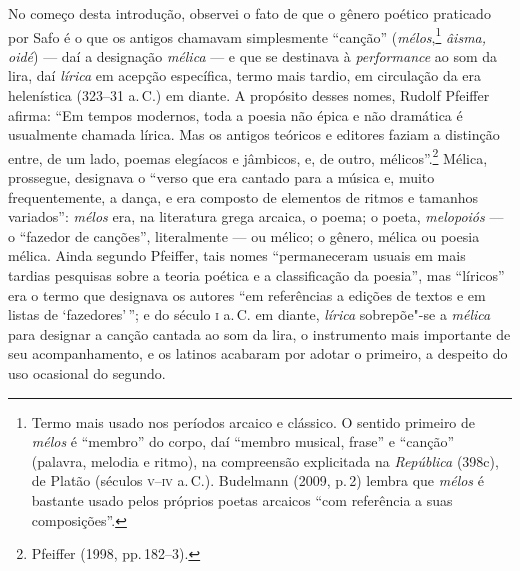 No começo desta introdução, observei o fato de que o gênero poético praticado
por Safo é o que os antigos chamavam simplesmente “canção”
(\emph{mélos},\footnote{ Termo mais usado nos períodos arcaico e clássico.
O sentido primeiro de \emph{mélos} é “membro” do corpo, daí “membro
musical, frase” e “canção” (palavra, melodia e ritmo), na compreensão
explicitada na \emph{República} (398c), de Platão (séculos \textsc{v}--\textsc{iv} a.\,C.).
Budelmann (2009, p.\,2) lembra que \emph{mélos} é bastante usado pelos próprios poetas arcaicos ``com referência a suas composições”.} \emph{âisma, oidé}) --- daí a
designação \emph{mélica} --- e que se destinava à \emph{performance} ao som
da lira, daí \emph{lírica} em acepção específica, termo mais tardio, em
circulação da era helenística (323--31 a.\,C.) em diante. A propósito
desses nomes, Rudolf Pfeiffer afirma: “Em tempos
modernos, toda a poesia não épica e não dramática é usualmente chamada lírica.
Mas os antigos teóricos e editores faziam a distinção entre, de um lado, poemas
elegíacos e jâmbicos, e, de outro, mélicos”.\footnote{ Pfeiffer (1998, pp.\,182--3).} Mélica, prossegue,
designava o “verso que era cantado para a música e, muito frequentemente, a
dança, e era composto de elementos de ritmos e tamanhos variados”:
\emph{mélos} era, na literatura grega arcaica, o poema; o poeta,
\emph{melopoiós} --- o “fazedor de canções”, literalmente --- ou mélico; o
gênero, mélica ou poesia mélica. Ainda segundo Pfeiffer, tais nomes
“permaneceram usuais em mais tardias pesquisas sobre a teoria poética e a
classificação da poesia”, mas “líricos” era o termo que designava os autores
“em referências a edições de textos e em listas de ‘fazedores’\,”; e do século \textsc{i}
a.\,C. em diante, \emph{lírica} sobrepõe"-se a \emph{mélica} para designar a canção
cantada ao som da lira, o instrumento mais importante de seu acompanhamento, e
os latinos acabaram por adotar o primeiro, a despeito do uso ocasional do
segundo.


